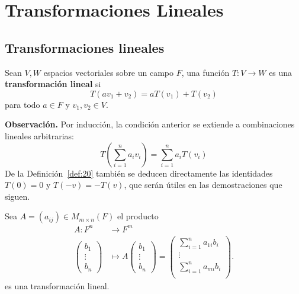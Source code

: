 \documentclass[12pt,a4paper]{book}
\newcommand{\parentesis}[1]{\left(#1\right)}
\begin{document}
    \chapter{Transformaciones Lineales}

    \section{Transformaciones lineales}


    \begin{definicion}
    \label{def:20}
        Sean $V,W$ espacios vectoriales sobre un campo $F$, una función $T:V\to W$ es una
        \textbf{transformación lineal} si
        \begin{equation*}
            T(av_{1}+v_{2})=aT(v_{1})+T(v_{2})
        \end{equation*}
        para todo $a\in F$ y $v_{1},v_{2}\in V$.
    \end{definicion}

    \textbf{Observación.}
    Por inducción, la condición anterior se extiende a combinaciones lineales arbitrarias:
    \begin{equation*}
        T\parentesis{\sum_{i = 1}^{n}a_{i}v_{i}} = \sum_{i = 1}^{n}a_{i}T(v_{i})
    \end{equation*}
    De la Definición~\ref{def:20} también se deducen directamente las identidades $T(0)=0$ y $T(-v)=-T(v)$, que serán útiles en las demostraciones que siguen.

    \begin{ejemplo}
    \label{ej:20}
        Sea $A = (a_{ij}) \in M_{m \times n}(F)$ el producto
        \begin{align*}
            A:F^{n} & \to F^{m}\\
            \begin{pmatrix}
                b_{1}\\
                \vdots\\
                b_{n}
            \end{pmatrix}
            & \mapsto A\begin{pmatrix}
                b_{1}\\
                \vdots\\
                b_{n}
            \end{pmatrix} = 
            \begin{pmatrix}
                \sum_{i = 1}^{n}a_{1i}b_{i}\\
                \vdots\\
                \sum_{i = 1}^{n}a_{mi}b_{i}\\
            \end{pmatrix}.
        \end{align*}
        es una transformación lineal.
    \end{ejemplo}
\end{document}
